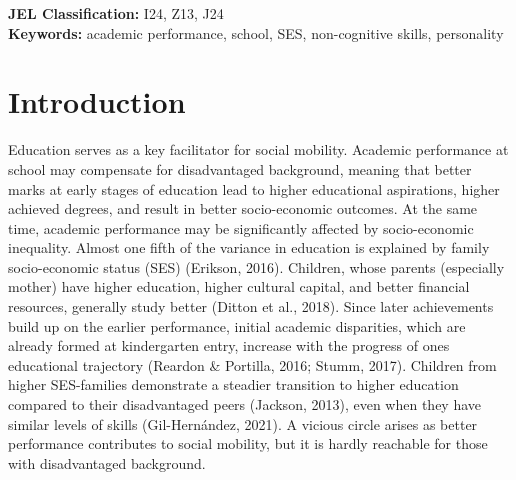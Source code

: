 \documentclass[
  12pt,
  a4paper,
]{article}
\newcommand{\jelandkeywords}[2]{
  \textbf{JEL Classification:} #1 \\
  \textbf{Keywords:} #2
}
\begin{document}
\jelandkeywords{I24, Z13, J24}{academic performance, school, SES, non-cognitive skills, personality}

\newpage

\hypertarget{introduction}{%
\section{Introduction}\label{introduction}}

Education serves as a key facilitator for social mobility. Academic
performance at school may compensate for disadvantaged background,
meaning that better marks at early stages of education lead to higher
educational aspirations, higher achieved degrees, and result in better
socio-economic outcomes. At the same time, academic performance may be
significantly affected by socio-economic inequality. Almost one fifth of
the variance in education is explained by family socio-economic status
(SES) (Erikson, 2016). Children, whose parents (especially mother) have
higher education, higher cultural capital, and better financial
resources, generally study better (Ditton et al., 2018). Since later
achievements build up on the earlier performance, initial academic
disparities, which are already formed at kindergarten entry, increase
with the progress of ones educational trajectory (Reardon \& Portilla,
2016; Stumm, 2017). Children from higher SES-families demonstrate a
steadier transition to higher education compared to their disadvantaged
peers (Jackson, 2013), even when they have similar levels of skills
(Gil-Hernández, 2021). A vicious circle arises as better performance
contributes to social mobility, but it is hardly reachable for those
with disadvantaged background.
\end{document}
